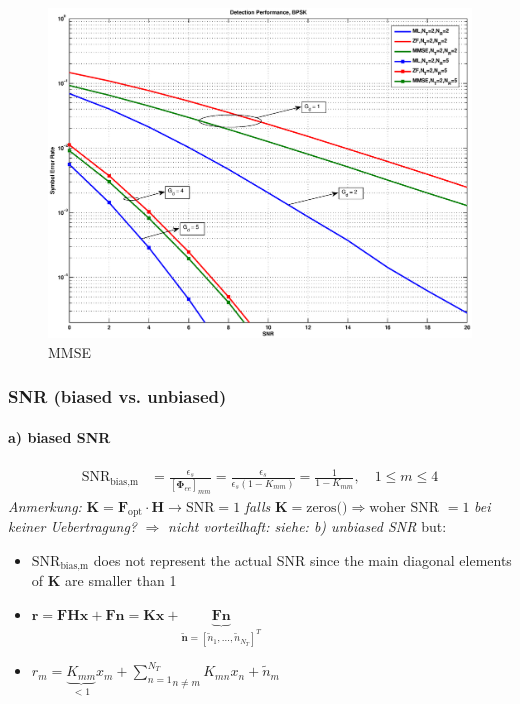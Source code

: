 \documentclass[a4paper, 10pt]{article}
\begin{document}
	\begin{figure}[h]
		\centering
		\includegraphics[width = \textwidth]{MMSE}
		\caption{MMSE}
		\label{MMSE}
	\end{figure}
	
\subsubsection{SNR (biased vs. unbiased)}
\paragraph*{a) biased SNR}
\begin{align*}
	\text{SNR}_{\text{bias,m}} &= \frac{\epsilon_s}{[\boldsymbol{\Phi}_{ee}]_{mm}} = \frac{\epsilon_s}{\epsilon_s(1 - K_{mm})} = \frac{1}{1 - K_{mm}}, \quad 1\leq m \leq 4 
\end{align*}
	\textit{Anmerkung: } $\mathbf{K} = \mathbf{F}_{\text{opt}}\cdot\mathbf{H} \rightarrow \text{SNR} = 1 $ \textit{falls } $ \mathbf{K} = \text{zeros()} \Rightarrow \text{woher SNR } = 1 $ \textit{ bei keiner Uebertragung?} $\Rightarrow $ \textit{ nicht vorteilhaft: siehe: b) unbiased SNR}  %
but: 
\begin{itemize}
	\item $\text{SNR}_{\text{bias,m}} $ does not represent the actual SNR since the main diagonal elements of $ \mathbf{K} $ are smaller than 1
	\item $ \mathbf{r} = \mathbf{FHx} + \mathbf{Fn} = \mathbf{Kx} + \underbrace{\mathbf{F}\mathbf{n} }_{\mathbf{\tilde{n}} = [\tilde{n}_1, \dots,\tilde{n}_{N_T}]^T } $
	\item $r_m = \underbrace{K_{mm}}_{<1}x_m + \underset{ n\neq m}{\sum\limits^{N_T}_{n = 1}}K_{mn}x_n + \tilde{n}_m $
\end{itemize}
\end{document}
